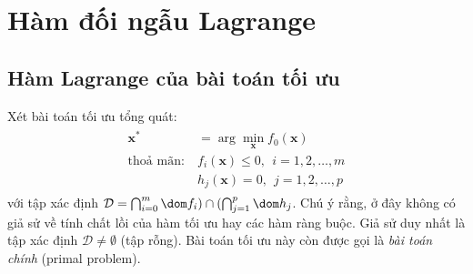  
 
 
 
 
\section{Hàm đối ngẫu Lagrange}
\subsection{Hàm Lagrange của bài toán tối ưu}
Xét bài toán tối ưu tổng quát:
\begin{eqnarray} 
\label{eqn:18_lagrangian}
\begin{aligned}
\mathbf{x}^* &= \arg\min_{\mathbf{x}} f_0(\mathbf{x}) \\
\text{thoả mãn:}~ & f_i(\mathbf{x}) \leq 0, ~~ i = 1, 2, \dots, m\\ 
& h_j(\mathbf{x}) = 0, ~~ j = 1, 2, \dots, p 
\end{aligned}
\end{eqnarray} 
với tập xác định $\mathcal{D} = \bigcap_{i=0}^m \dom f_i) \cap (\bigcap_{j=1}^p \dom
h_j$. Chú ý rằng, ở đây không có giả sử về tính chất lồi của hàm tối ưu
hay các hàm ràng buộc. Giả sử duy nhất là tập xác định $\mathcal{D} \neq
\emptyset$ (tập rỗng). Bài toán tối ưu này còn được gọi là \textit{bài toán chính} ({primal problem}).


